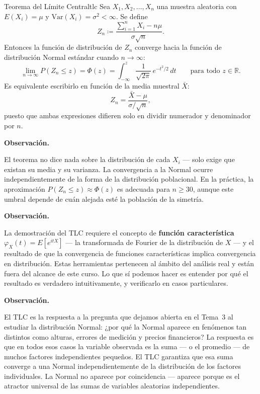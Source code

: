 \documentclass[12pt, a4paper]{book}
\newenvironment{observacion}{%
    \par\medskip\noindent\textbf{\color{azul}Observaci\'{o}n.}\enspace\itshape
}{\par\medskip}
\numberwithin{equation}{chapter}
\begin{document}
\begin{teorema}{Teorema del L\'{i}mite Central}{tlc}
	Sea $X_1, X_2, \ldots, X_n$ una muestra aleatoria
	con $E(X_i) = \mu$ y $\mathrm{Var}(X_i) = \sigma^2
	< \infty$. Se define
	\[
	Z_n \coloneqq \frac{\displaystyle\sum_{i=1}^n
		X_i - n\mu}{\sigma\sqrt{n}}.
	\]
	Entonces la funci\'{o}n de distribuci\'{o}n de $Z_n$
	converge hacia la funci\'{o}n de distribuci\'{o}n
	Normal est\'{a}ndar cuando $n \to \infty$:
	\[
	\lim_{n\to\infty} P(Z_n \leq z)
	= \Phi(z)
	= \int_{-\infty}^{z} \frac{1}{\sqrt{2\pi}}\,
	e^{-t^2/2}\,dt
	\qquad \text{para todo } z \in \mathbb{R}.
	\]
	Es equivalente escribirlo en funci\'{o}n de la media
	muestral $\bar{X}$:
	\[
	Z_n = \frac{\bar{X} - \mu}{\sigma/\sqrt{n}},
	\]
	puesto que ambas expresiones difieren solo en dividir
	numerador y denominador por $n$.
\end{teorema}

\begin{observacion}
	El teorema no dice nada sobre la distribuci\'{o}n de
	cada $X_i$ --- solo exige que existan su media y su
	varianza. La convergencia a la Normal ocurre
	independientemente de la forma de la distribuci\'{o}n
	poblacional. En la pr\'{a}ctica, la aproximaci\'{o}n
	$P(Z_n \leq z) \approx \Phi(z)$ es adecuada para
	$n \geq 30$, aunque este umbral depende de cu\'{a}n
	alejada est\'{e} la poblaci\'{o}n de la simetr\'{i}a.
\end{observacion}

\begin{observacion}
	La demostraci\'{o}n del TLC requiere el concepto de
	\textbf{funci\'{o}n caracter\'{i}stica}
	$\varphi_X(t) = E[e^{itX}]$ --- la transformada de
	Fourier de la distribuci\'{o}n de $X$ --- y el
	resultado de que la convergencia de funciones
	caracter\'{i}sticas implica convergencia en
	distribuci\'{o}n. Estas herramientas pertenecen al
	\'{a}mbito del an\'{a}lisis real y est\'{a}n fuera
	del alcance de este curso. Lo que s\'{i} podemos
	hacer es entender por qu\'{e} el resultado es
	verdadero intuitivamente, y verificarlo en casos
	particulares.
\end{observacion}

\begin{observacion}
	El TLC es la respuesta a la pregunta que dejamos
	abierta en el Tema~3 al estudiar la distribuci\'{o}n
	Normal: ¿por qu\'{e} la Normal aparece en fen\'{o}menos
	tan distintos como alturas, errores de medici\'{o}n
	y precios financieros? La respuesta es que en todos
	esos casos la variable observada es la suma --- o el
	promedio --- de muchos factores independientes
	peque\~{n}os. El TLC garantiza que esa suma converge
	a una Normal independientemente de la distribuci\'{o}n
	de los factores individuales. La Normal no aparece
	por coincidencia --- aparece porque es el atractor
	universal de las sumas de variables aleatorias
	independientes.
\end{observacion}
\end{document}
